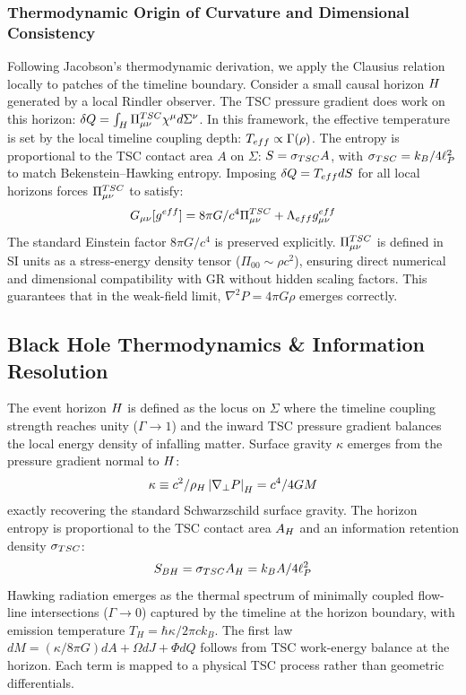 \documentclass[11pt,a4paper]{article}
\def\frac#1#2{#1/#2} \def\phantom#1{} \def\ensuremath#1{#1}
\let\text\relax \let\mathrm\relax \let\mathbf\relax \let\mathcal\relax
\begin{document}
\subsubsection*{Thermodynamic Origin of Curvature and Dimensional Consistency}
Following Jacobson's thermodynamic derivation, we apply the Clausius relation locally to patches of the timeline boundary. Consider a small causal horizon $\mathcal{H}$ generated by a local Rindler observer. The TSC pressure gradient does work on this horizon: $\delta Q = \int_{\mathcal{H}} \Pi_{\mu\nu}^{\text{TSC}} \chi^\mu d\Sigma^\nu$. In this framework, the effective temperature is set by the local timeline coupling depth: $T_{\text{eff}} \propto \Gamma(\rho)$. The entropy is proportional to the TSC contact area $A$ on $\Sigma$: $S = \sigma_{\text{TSC}} A$, with $\sigma_{\text{TSC}} = k_B / 4\ell_P^2$ to match Bekenstein--Hawking entropy. Imposing $\delta Q = T_{\text{eff}} dS$ for all local horizons forces $\Pi_{\mu\nu}^{\text{TSC}}$ to satisfy:
\begin{equation}
G_{\mu\nu}[g^{\text{eff}}] = \frac{8\pi G}{c^4} \Pi_{\mu\nu}^{\text{TSC}} + \Lambda_{\text{eff}} g_{\mu\nu}^{\text{eff}}
\end{equation}
The standard Einstein factor $8\pi G/c^4$ is preserved explicitly. $\Pi_{\mu\nu}^{\text{TSC}}$ is defined in SI units as a stress-energy density tensor ($\Pi_{00} \sim \rho c^2$), ensuring direct numerical and dimensional compatibility with GR without hidden scaling factors. This guarantees that in the weak-field limit, $\nabla^2 P = 4\pi G \rho$ emerges correctly.

\subsection{Black Hole Thermodynamics \& Information Resolution}
The event horizon $\mathcal{H}$ is defined as the locus on $\Sigma$ where the timeline coupling strength reaches unity ($\Gamma \to 1$) and the inward TSC pressure gradient balances the local energy density of infalling matter. Surface gravity $\kappa$ emerges from the pressure gradient normal to $\mathcal{H}$:
\begin{equation}
\kappa \equiv \frac{c^2}{\rho_{\mathcal{H}}} \left| \nabla_\perp P \right|_{\mathcal{H}} = \frac{c^4}{4GM}
\end{equation}
exactly recovering the standard Schwarzschild surface gravity. The horizon entropy is proportional to the TSC contact area $A_{\mathcal{H}}$ and an information retention density $\sigma_{\text{TSC}}$:
\begin{equation}
S_{\text{BH}} = \sigma_{\text{TSC}} A_{\mathcal{H}} = \frac{k_B A}{4\ell_P^2}
\end{equation}
Hawking radiation emerges as the thermal spectrum of minimally coupled flow-line intersections ($\Gamma \to 0$) captured by the timeline at the horizon boundary, with emission temperature $T_H = \hbar \kappa / 2\pi c k_B$. The first law $dM = (\kappa/8\pi G) dA + \Omega dJ + \Phi dQ$ follows from TSC work-energy balance at the horizon. Each term is mapped to a physical TSC process rather than geometric differentials.
\end{document}
